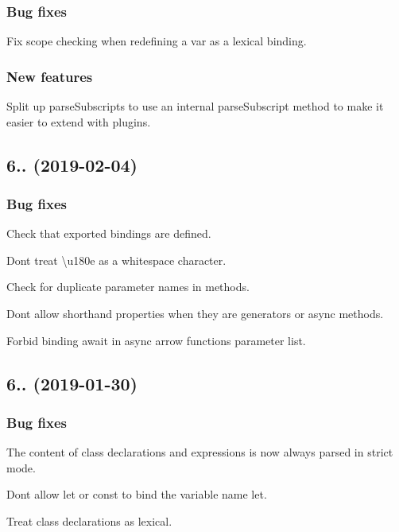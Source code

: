 \subsubsection*{Bug fixes}

Fix scope checking when redefining a {\ttfamily var} as a lexical binding.

\subsubsection*{New features}

Split up {\ttfamily parse\+Subscripts} to use an internal {\ttfamily parse\+Subscript} method to make it easier to extend with plugins.

\subsection*{6.. (2019-\/02-\/04)}

\subsubsection*{Bug fixes}

Check that exported bindings are defined.

Don\textquotesingle{}t treat {\ttfamily \textbackslash{}u180e} as a whitespace character.

Check for duplicate parameter names in methods.

Don\textquotesingle{}t allow shorthand properties when they are generators or async methods.

Forbid binding {\ttfamily await} in async arrow function\textquotesingle{}s parameter list.

\subsection*{6.. (2019-\/01-\/30)}

\subsubsection*{Bug fixes}

The content of class declarations and expressions is now always parsed in strict mode.

Don\textquotesingle{}t allow {\ttfamily let} or {\ttfamily const} to bind the variable name {\ttfamily let}.

Treat class declarations as lexical.

